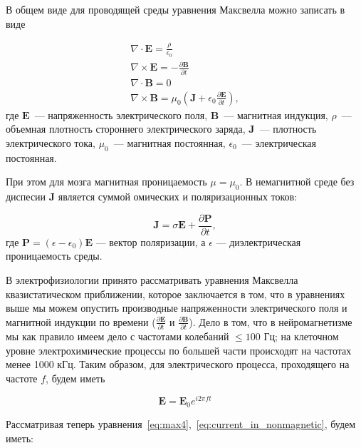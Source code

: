 В общем виде для проводящей среды уравнения Максвелла можно записать в виде

\begin{gather}
    \nabla \cdot \mathbf{E}  = \frac{\rho}{\epsilon_0} \label{eq:max1} \\
    \nabla \times \mathbf{E} = {-\frac{\partial \mathbf{B}}{\partial t}} \label{eq:max2} \\
    \nabla \cdot \mathbf{B}  = 0 \label{eq:max3} \\
    \nabla \times \mathbf{B} = \mu_0 (\mathbf{J} + \epsilon_0 \frac{\partial \mathbf{E}}{\partial t})
    \label{eq:max4},
\end{gather}
где $\mathbf{E}$~--- напряженность электрического поля, $\mathbf{B}$~--- магнитная индукция,
$\rho$~--- объемная плотность стороннего электрического заряда,
$\mathbf{J}$~--- плотность электрического тока,
$\mu_0$~--- магнитная постоянная,
$\epsilon_0$~--- электрическая постоянная.



При этом для мозга магнитная проницаемость $\mu = \mu_0$.  В немагнитной среде
без диспесии $\mathbf{J}$ является суммой омических и поляризационных токов:

\begin{equation}
    \mathbf{J} = \sigma \mathbf{E} + \frac{\partial \mathbf{P}}{\partial t},
    \label{eq:current_in_nonmagnetic}
\end{equation}
где $\mathbf{P} = (\epsilon - \epsilon_0) \mathbf{E}$ --- вектор поляризации,
а $\epsilon$ --- диэлектрическая проницаемость среды.

В электрофизиологии принято рассматривать уравнения  Максвелла квазистатическом
приближении, которое заключается в том, что в уравнениях выше мы можем опустить
производные напряженности электрического поля и магнитной индукции по времени
($\frac{\partial \mathbf{E}}{\partial t}$ и $\frac{\partial
\mathbf{B}}{\partial t}$).  Дело в том, что в нейромагнетизме мы как правило
имеем дело с частотами колебаний $\leq 100$ Гц; на клеточном уровне
электрохимические процессы по большей части происходят на частотах менее 1000
кГц.  Таким образом, для электрического процесса, проходящего на частоте $f$,
будем иметь

\begin{equation}
    \mathbf{E} = \mathbf{E}_0 e^{i2\pi ft}
\end{equation}

Рассматривая теперь уравнения~\ref{eq:max4},~\ref{eq:current_in_nonmagnetic}, будем иметь:


